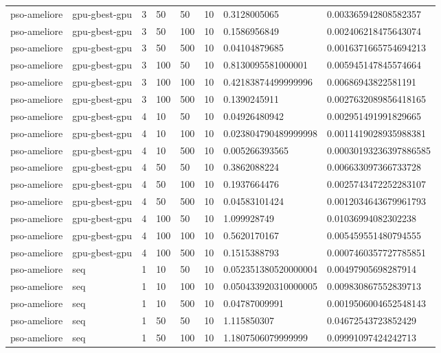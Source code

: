 \begin{table}[t]
\begin{tabular}{llllllll}
pso-ameliore & gpu-gbest-gpu & 3 & 50 & 50 & 10 & 0.3128005065 & 0.003365942808582357 \\
pso-ameliore & gpu-gbest-gpu & 3 & 50 & 100 & 10 & 0.1586956849 & 0.002406218475643074 \\
pso-ameliore & gpu-gbest-gpu & 3 & 50 & 500 & 10 & 0.04104879685 & 0.0016371665754694213 \\
pso-ameliore & gpu-gbest-gpu & 3 & 100 & 50 & 10 & 0.8130095581000001 & 0.005945147845574664 \\
pso-ameliore & gpu-gbest-gpu & 3 & 100 & 100 & 10 & 0.42183874499999996 & 0.00686943822581191 \\
pso-ameliore & gpu-gbest-gpu & 3 & 100 & 500 & 10 & 0.1390245911 & 0.0027632089856418165 \\
pso-ameliore & gpu-gbest-gpu & 4 & 10 & 50 & 10 & 0.04926480942 & 0.002951491991829665 \\
pso-ameliore & gpu-gbest-gpu & 4 & 10 & 100 & 10 & 0.023804790489999998 & 0.0011419028935988381 \\
pso-ameliore & gpu-gbest-gpu & 4 & 10 & 500 & 10 & 0.005266393565 & 0.00030193236397886585 \\
pso-ameliore & gpu-gbest-gpu & 4 & 50 & 50 & 10 & 0.3862088224 & 0.006633097366733728 \\
pso-ameliore & gpu-gbest-gpu & 4 & 50 & 100 & 10 & 0.1937664476 & 0.0025743472252283107 \\
pso-ameliore & gpu-gbest-gpu & 4 & 50 & 500 & 10 & 0.04583101424 & 0.0012034643679961793 \\
pso-ameliore & gpu-gbest-gpu & 4 & 100 & 50 & 10 & 1.099928749 & 0.01036994082302238 \\
pso-ameliore & gpu-gbest-gpu & 4 & 100 & 100 & 10 & 0.5620170167 & 0.005459551480794555 \\
pso-ameliore & gpu-gbest-gpu & 4 & 100 & 500 & 10 & 0.1515388793 & 0.0007460357727785851 \\
pso-ameliore & seq & 1 & 10 & 50 & 10 & 0.052351380520000004 & 0.00497905698287914 \\
pso-ameliore & seq & 1 & 10 & 100 & 10 & 0.050433920310000005 & 0.009830867552839713 \\
pso-ameliore & seq & 1 & 10 & 500 & 10 & 0.04787009991 & 0.0019506004652548143 \\
pso-ameliore & seq & 1 & 50 & 50 & 10 & 1.115850307 & 0.04672543723852429 \\
pso-ameliore & seq & 1 & 50 & 100 & 10 & 1.1807506079999999 & 0.09991097424242713 \\

\end{tabular}
\end{table}
